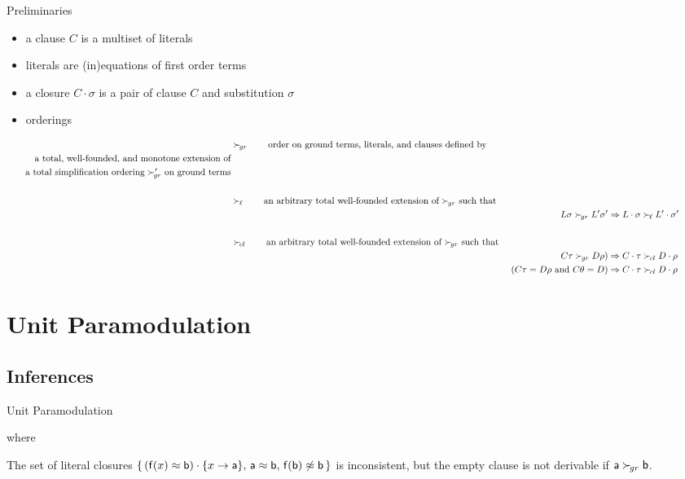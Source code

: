 \documentclass[%
handout,
]{beamer}
\begin{document}
\begin{frame}[allowframebreaks]{Preliminaries}

    \begin{itemize}
        \item a clause $C$ is a multiset of literals
        \item literals are (in)equations of first order terms
        \item a closure $C\cdot\sigma$ is a pair of clause $C$ and substitution $\sigma$
        \framebreak
        \item orderings
    \end{itemize}
    \begin{align*}
        &\succG
        \tag*{order on ground terms, literals, and clauses defined by}
        \\
        \tag*{a total, well-founded, and monotone extension of}
        \\
        \tag*{a total simplification ordering $\succG'$ on ground terms}
        \\
        \\
        &\succL
        \tag*{an arbitrary total well-founded extension of $\succG$ such that}
        \\
        && L\sigma\succG L'\sigma' &\Rightarrow L\cdot\sigma\succL L'\cdot\sigma'\tag*{}
        \\
        \\
        &\succC \tag*{an arbitrary total well-founded extension of $\succG$ such that }
        \\
        && C\tau\succG D\rho\text)
        &\Rightarrow C\cdot\tau\succC D\cdot\rho   \tag*{}
        \\
        && (C\tau=D\rho\text{ and }C\theta = D)
        &\Rightarrow C\cdot\tau\succC D\cdot\rho   \tag*{}
    \end{align*}
\end{frame}

\section{Unit Paramodulation}
\subsection{Inferences}
\begin{frame}{Unit Paramodulation}

    \begin{definition}
    
    where
    
    \end{definition}

    \vspace{1.4em}
    \begin{remark}
    The set of literal closures
    $\{\,
    (\mathsf{f}(x)\approx\mathsf{b})\cdot\{x\to\mathsf{a}\},\,
    \mathsf{a}\approx \mathsf{b},\,
    \mathsf{f}(\mathsf{b})\not\approx\mathsf{b}\,
    \}$ is inconsistent,
    but the empty clause is not derivable
    if $\mathsf{a}\mathrel\succ_{\!gr}\mathsf{b}$.
    \end{remark}

\end{frame}
\end{document}
